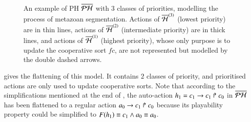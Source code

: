 \begin{figure}[htp]
  \centering
  \caption{
  \label{fig:metazoan-php}
    An example of PH $\overline{\mathcal{PH}}$ with $3$ classes of priorities,
    modelling the process of metazoan segmentation.
    Actions of $\overline{\mathcal{H}}^{(3)}$ (lowest priority) are in thin lines,
    actions of $\overline{\mathcal{H}}^{(2)}$ (intermediate priority) are in thick lines,
    and actions of $\overline{\mathcal{H}}^{(1)}$ (highest priority), whose only purpose is to update the cooperative sort $fc$,
    are not represented but modelled by the double dashed arrows.
  }
\end{figure}

 gives the flattening of this model.
It contains $2$ classes of priority, and prioritised actions are only used to update cooperative sorts.
Note that according to the simplifications mentioned at the end of ,
the auto-action $h_1 = c_1\rightarrow c_1\Rsh c_0$ in $\overline{\mathcal{PH}}$ has been flattened to a regular action $a_0\rightarrow c_1\Rsh c_0$
because its playability property could be simplified to $F(h_1) \equiv c_1 \wedge a_0 \equiv a_0$.

